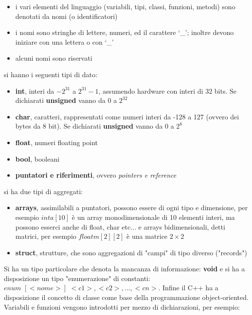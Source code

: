 \documentclass[a4paper,12pt, oneside]{book}
\begin{document}
\begin{itemize}
\item i vari elementi del linguaggio (variabili, tipi, classi, funzioni, metodi) sono denotati da nomi (o identificatori)
\item i nomi sono stringhe di lettere, numeri, ed il carattere ‘\_'; inoltre devono iniziare con una lettera o con ‘\_'
\item alcuni nomi sono riservati
\end{itemize}
\newpage
si hanno i seguenti tipi di dato:
\begin{itemize}
\item \textbf{int}, interi da $-2^{31}$ a $2^{31}-1$, assumendo hardware con interi di 32 bits. Se dichiarati \textbf{unsigned} vanno da $0$ a $2^32$
\item \textbf{char}, caratteri, rappresentati come numeri interi da -128 a 127 (ovvero dei
bytes da 8 bit). Se dichiarati \textbf{unsigned} vanno da $0 $ a $2^8$
\item \textbf{float}, numeri floating point
\item \textbf{bool}, booleani
\item \textbf{puntatori e riferimenti}, ovvero \textit{pointers e reference}
\end{itemize}
si ha due tipi di aggregati:
\begin{itemize}
\item \textbf{arrays}, assimilabili a puntatori, possono essere di ogni tipo e dimensione, per esempio $int a[10]$ è un array monodimensionale di 10 elementi interi, ma possono esserci anche di float, char etc... e arrays bidimensionali, detti matrici, per esempio $float m[2][2]$ è una matrice $2\times 2$
\item \textbf{struct}, strutture, che sono aggregazioni di "campi" di tipo diverso ("records")
\end{itemize}
Si ha un tipo particolare che denota la mancanza di informazione: \textbf{void} e si ha a disposizione un tipo "enumerazione" di constanti: \\$enum\,\, [<nome>]\,\, { <c1>, <c2>, ..., <cn> }$. Infine il C++ ha a disposizione il concetto di classe come base della programmazione object-oriented.		\\
Variabili e funzioni vengono introdotti per mezzo di dichiarazioni, per esempio:
\end{document}

